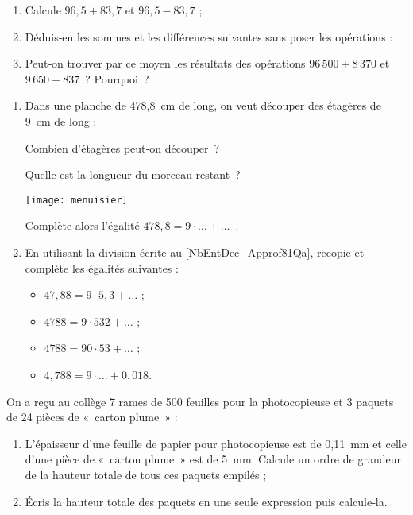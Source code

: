 \begin{exercice}
\begin{enumerate}
 \item Calcule $96,5 + 83,7$ et $96,5 - 83,7$ ;
 \item Déduis‑en les sommes et les différences suivantes sans poser les opérations :
 \item Peut‑on trouver par ce moyen les résultats des opérations $96\,500 + 8\,370$ et $9\,650 - 837$ ? Pourquoi ?
 \end{enumerate}
\end{exercice}


\begin{exercice}
\begin{enumerate}
 \item Dans une planche de 478,8 cm de long, on veut découper des étagères de 9 cm de long :
 
Combien d'étagères peut‑on découper ? 

Quelle est la longueur du morceau restant ? 

\begin{center} \texttt{[image: menuisier]} \end{center}

Complète alors l'égalité $478,8 = 9 \cdot \ldots + \ldots$ . \label{NbEntDec_Approf81Qa}

 \item En utilisant la division écrite au \ref{NbEntDec_Approf81Qa}, recopie et complète les égalités suivantes :
 \begin{itemize}  
  \item $47,88 = 9 \cdot 5,3 + \ldots$ ;
  \item $4 788 = 9 \cdot 532 + \ldots$ ;
  \item $4 788 = 90 \cdot 53 + \ldots$ ;
  \item $4,788 = 9 \cdot \ldots + 0,018$.
  \end{itemize}
 \end{enumerate}
\end{exercice}


\begin{exercice}
On a reçu au collège 7 rames de 500 feuilles pour la photocopieuse et 3 paquets de 24 pièces de « carton plume » :
\begin{enumerate}
 \item L'épaisseur d'une feuille de papier pour photocopieuse est de 0,11 mm et celle d'une pièce de « carton plume » est de 5 mm. Calcule un ordre de grandeur de la hauteur totale de tous ces paquets empilés ;
 \item Écris la hauteur totale des paquets en une seule expression puis calcule‑la.
 \end{enumerate}
\end{exercice}


